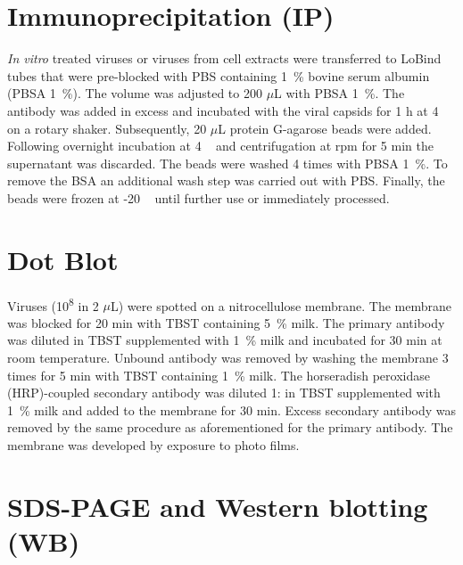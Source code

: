 \section{Immunoprecipitation (IP)}
\textit{In vitro} treated viruses or viruses from cell extracts were transferred to LoBind tubes that were pre-blocked with PBS containing 1~\% bovine serum albumin (PBSA 1~\%). The volume was adjusted to 200 $\mu$L with PBSA 1~\%. The antibody was added in excess and incubated with the viral capsids for 1 h at 4 \textcelsius~ on a rotary shaker. Subsequently, 20 $\mu$L protein G-agarose beads were added. Following overnight incubation at 4 \textcelsius~ and centrifugation at  rpm for 5 min the supernatant was discarded. The beads were washed 4 times with PBSA 1~\%. To remove the BSA an additional wash step was carried out with PBS. Finally, the beads were frozen at -20 \textcelsius~ until further use or immediately processed. 


\section{Dot Blot}
Viruses (10\textsuperscript{8} in 2 $\mu$L) were spotted on a nitrocellulose membrane. The membrane was blocked for 20 min with TBST containing 5~\% milk. The primary antibody was diluted in TBST supplemented with 1~\% milk and incubated for 30 min at room temperature. Unbound antibody was removed by washing the membrane 3 times for 5 min with TBST containing 1~\% milk. The horseradish peroxidase (HRP)-coupled secondary antibody was diluted 1: in TBST supplemented with 1~\% milk and added to the membrane for 30 min. Excess secondary antibody was removed by the same procedure as aforementioned for the primary antibody. The membrane was developed by exposure to photo films.    


\section{SDS-PAGE and Western blotting (WB)}

